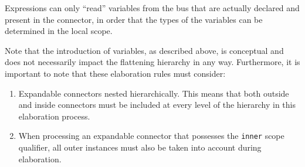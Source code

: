 \begin{nonnormative}
Expressions can only ``read'' variables from the bus that
are actually declared and present in the connector, in order that the
types of the variables can be determined in the local scope.
\end{nonnormative}

\begin{nonnormative}
Note that the introduction of variables, as described above, is
conceptual and does not necessarily impact the flattening hierarchy in
any way. Furthermore, it is important to note that these elaboration
rules must consider:
\begin{enumerate}
\item Expandable connectors nested hierarchically. This means that
both outside and inside connectors must be included at every level of
the hierarchy in this elaboration process.
\item When processing an expandable connector that possesses the
\lstinline!inner! scope qualifier, all outer instances must also be taken into
account during elaboration.
\end{enumerate}
\end{nonnormative}

